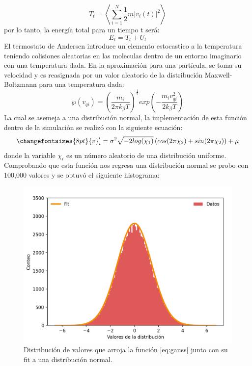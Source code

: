 \begin{equation}
    \label{eq:kin-n}
    T_t=\left\langle \sum_{i=1}^N \frac{1}{2}m|v_i(t)|^2\right\rangle
\end{equation}
por lo tanto, la energía total para un tiempo t será:
\begin{equation}
    \label{eq:e-tot}
    E_t=T_t+U_t
\end{equation}
El termostato de Andersen introduce un elemento estocastico a la temperatura teniendo colisiones aleatorias en las moleculas dentro de un 
entorno imaginario con una temperatura dada. En la aproximación para una partícula, se toma su velocidad y es reasignada por un valor aleatorio
de la distribución Maxwell-Boltzmann para una temperatura dada:
\begin{equation}
    \wp(v_{qi})= \left(\frac{m_i}{2\pi k_\beta T} \right)^\frac{1}{2} exp\left(- \frac{m_i v_{qi}^2}{2k_\beta T} \right)
\end{equation}
La cual se asemeja a una distribución normal, la implementación de esta función dentro de la simulación se realizó con la siguiente ecuación:
\begin{equation}
    \changefontsizes{8pt}
    {v}'_i= \sigma^2 \sqrt{-2log(\chi_1)} \left(cos(2\pi \chi_2) + sin(2\pi \chi_2) \right) + \mu 
    \label{eq:gauss}
\end{equation}
donde la variable $\chi_i$ es un número aleatorio de una distribución uniforme. Comprobando que esta función nos regresa una distribución normal
se probo con 100,000 valores y se obtuvó el siguiente histograma:
\begin{figure}[H]
    \includegraphics[scale=0.4]{../Graphics/norm.png}
    \caption{Distribución de valores que arroja la función \ref{eq:gauss} junto con su fit a una distribución normal.}
\end{figure}